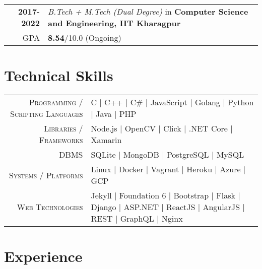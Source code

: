 \documentclass[a4paper,10pt]{extarticle} %
\begin{document}
\begin{tabular}{r|p{17.5cm}}	
\textbf{2017-2022} & \textit{B.Tech + M.Tech (Dual Degree)} in \textbf{Computer Science and Engineering, IIT Kharagpur}\\
\hfill GPA & \textbf{8.54}/10.0 (Ongoing)\\
\end{tabular}


\section{\textcolor{primary}{Technical Skills}}

\begin{tabular}{r|p{15cm}}
\textsc{Programming / Scripting Languages} & C | C++ | C\# | JavaScript | Golang | Python | Java | PHP \\
\textsc{Libraries / Frameworks} & Node.js | OpenCV | Click | .NET Core | Xamarin \\
\textsc{DBMS} & SQLite | MongoDB | PostgreSQL | MySQL \\
\textsc{Systems / Platforms} & Linux | Docker | Vagrant | Heroku | Azure | GCP \\
\textsc{Web Technologies} & Jekyll | Foundation 6 | Bootstrap | Flask | Django | ASP.NET | ReactJS | AngularJS | REST | GraphQL | Nginx \\
\end{tabular}


\section{\textcolor{primary}{Experience}}
\end{document}
